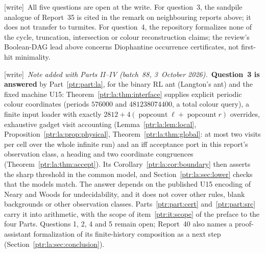 \documentclass[11pt,letterpaper]{article}
\theoremstyle{definition}\newtheorem{definition}[theorem]{Definition}
\theoremstyle{remark}\newtheorem{remark}[theorem]{Remark}
\newcommand{\pop}{\operatorname{popcount}}
\newcommand{\wtag}{\textup{[write]}}
\newcommand{\bnote}{\wtag\ \emph{Note added with Parts II--IV (batch~88, 3~October 2026).}}
\begin{document}
{\small\wtag\ All five questions are open at the write. For question~3, the
sandpile analogue of Report~35 is cited in the remark on neighbouring
reports above; it does not transfer to turmites. For question~4, the
repository formalizes none of the cycle, truncation, intersection or colour
reconstruction claims; the review's Boolean-DAG lead above concerns
Diophantine occurrence certificates, not first-hit minimality.

\bnote\ \textbf{Question~3 is answered} by Part~\ref{ptr:part:la}, for the
binary RL ant (Langton's ant) and the fixed machine U15:
Theorem~\ref{ptr:la:thm:interface} supplies explicit periodic colour
coordinates (periods $576000$ and $481238074400$, a total colour query), a
finite input loader with exactly $2812+4(\pop\ell+\pop r)$ overrides,
exhaustive gadget visit accounting (Lemma~\ref{ptr:la:lem:local},
Proposition~\ref{ptr:la:prop:physical}, Theorem~\ref{ptr:la:thm:global}: at
most two visits per cell over the whole infinite run) and an iff acceptance
port in this report's observation class, a heading and two coordinate
congruences (Theorem~\ref{ptr:la:thm:accept}). Its
Corollary~\ref{ptr:la:cor:boundary} then asserts the sharp threshold in the
common model, and Section~\ref{ptr:la:sec:lower} checks that the models match.
The answer depends on the published U15 encoding of Neary and Woods for
undecidability, and it does not cover other rules, blank backgrounds or other
observation classes. Parts~\ref{ptr:part:cert} and~\ref{ptr:part:src} carry
it into arithmetic, with the scope of item~\ref{ptr:it:scope} of the preface
to the four Parts. Questions 1, 2, 4 and 5 remain open; Report~40 also names a
proof-assistant formalization of its finite-history composition as a next
step (Section~\ref{ptr:la:sec:conclusion}).\par}

\appendix
\end{document}
